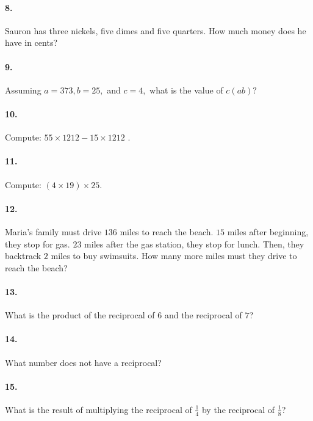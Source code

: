 \documentclass[16pt]{article}
\begin{document}
\paragraph{8. } Sauron has three nickels, five dimes and five quarters. How much money does he have in cents?

\paragraph{9. } Assuming $a=373, b=25,$ and $c=4,$ what is the value of $c(ab)?$

\paragraph{10. } Compute: $55\times1212-15\times1212$ .

\paragraph{11. } Compute: $(4\times 19)\times 25$.

\paragraph{12. } Maria's family must drive $136$ miles to reach the beach. $15$ miles after beginning, they stop for gas. $23$ miles after the gas station, they stop for lunch. Then, they backtrack $2$ miles to buy swimsuits. How many more miles must they drive to reach the beach?

\paragraph{13. } What is the product of the reciprocal of $6$ and the reciprocal of $7$?

\paragraph{14. } What number does not have a reciprocal?

\paragraph{15. } What is the result of multiplying the reciprocal of $\frac{1}{4}$ by the reciprocal of $\frac{1}{8}$?
\end{document}
